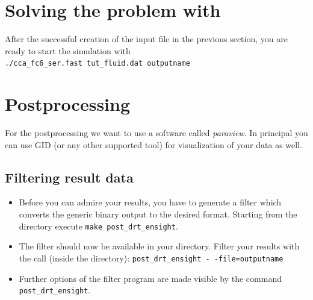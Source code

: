 \section{Solving the problem with \baci{}}

After the successful creation of the input file in the previous section,
you are ready to start the simulation with \\
\texttt{./cca\_fc6\_ser.fast tut\_fluid.dat outputname}
\section{Postprocessing}

For the postprocessing we want to use a software called \emph{paraview}. 
In principal you can use GID (or any other supported tool) for visualization 
of your data as well.

\subsection{Filtering result data}
\begin{itemize}
\item Before you can admire your results, you have to generate a filter 
which converts the generic binary \baci{} output to the desired format.
Starting from the \baci{} directory execute \texttt{make post\_drt\_ensight}.
\item The filter should now be available in your \baci{} directory. Filter your results with
the call (inside the \baci{} directory): \texttt{post\_drt\_ensight -\,-file=outputname} 
\item Further options of the filter program are made visible by the command \texttt{post\_drt\_ensight}.
\end{itemize}

